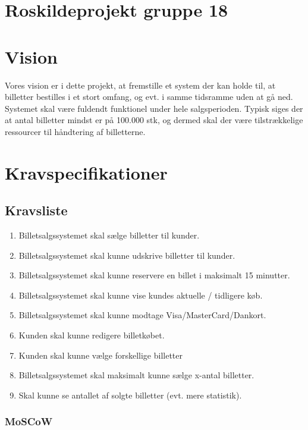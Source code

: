 


\section{Roskildeprojekt gruppe 18}

\section{Vision}
Vores vision er i dette projekt, at fremstille et system der kan holde til, at billetter bestilles i et stort omfang, og evt. i samme tidsramme uden at gå ned.
Systemet skal være fuldendt funktionel under hele salgsperioden.
Typisk siges der at antal billetter mindst er på 100.000 stk, og dermed skal der være tilstrækkelige ressourcer til håndtering af billetterne.\\

\section{Kravspecifikationer}

\subsection{Kravsliste}

\begin{enumerate}
    \item Billetsalgssystemet skal sælge billetter til kunder.
    \item Billetsalgssystemet skal kunne udskrive billetter til kunder.
    \item Billetsalgssystemet skal kunne reservere en billet i maksimalt 15 minutter.
    \item Billetsalgssystemet skal kunne vise kundes aktuelle / tidligere køb.
    \item Billetsalgssystemet skal kunne modtage Visa/MasterCard/Dankort.
    \item Kunden skal kunne redigere billetkøbet.
    \item Kunden skal kunne vælge forskellige billetter
    \item Billetsalgssystemet skal maksimalt kunne sælge x-antal billetter.
    \item Skal kunne se antallet af solgte billetter (evt. mere statistik).
\end{enumerate}

\subsubsection{MoSCoW}

